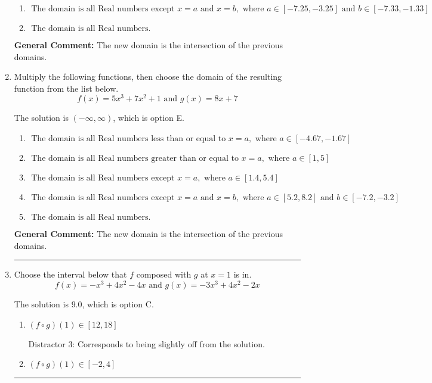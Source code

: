 \documentclass{extbook}[14pt]
\newcommand{\litem}[1]{\item #1

\rule{\textwidth}{0.4pt}}
\begin{document}
\begin{enumerate}
{\begin{enumerate}[label=\Alph*.]
\item \( \text{ The domain is all Real numbers except } x = a \text{ and } x = b, \text{ where } a \in [-7.25, -3.25] \text{ and } b \in [-7.33, -1.33] \)


\item \( \text{ The domain is all Real numbers. } \)


\end{enumerate}

\textbf{General Comment:} The new domain is the intersection of the previous domains.
}
\litem{
Multiply the following functions, then choose the domain of the resulting function from the list below.
\[ f(x) = 5x^{3} +7 x^{2} + 1 \text{ and } g(x) = 8x + 7 \]

The solution is \( (-\infty, \infty) \), which is option E.\begin{enumerate}[label=\Alph*.]
\item \( \text{ The domain is all Real numbers less than or equal to } x = a, \text{ where } a \in [-4.67, -1.67] \)


\item \( \text{ The domain is all Real numbers greater than or equal to } x = a, \text{ where } a \in [1, 5] \)


\item \( \text{ The domain is all Real numbers except } x = a, \text{ where } a \in [1.4, 5.4] \)


\item \( \text{ The domain is all Real numbers except } x = a \text{ and } x = b, \text{ where } a \in [5.2, 8.2] \text{ and } b \in [-7.2, -3.2] \)


\item \( \text{ The domain is all Real numbers. } \)


\end{enumerate}

\textbf{General Comment:} The new domain is the intersection of the previous domains.
}
\litem{
Choose the interval below that $f$ composed with $g$ at $x=1$ is in.
\[ f(x) = -x^{3} +4 x^{2} -4 x \text{ and } g(x) = -3x^{3} +4 x^{2} -2 x \]

The solution is \( 9.0 \), which is option C.\begin{enumerate}[label=\Alph*.]
\item \( (f \circ g)(1) \in [12, 18] \)

 Distractor 3: Corresponds to being slightly off from the solution.
\item \( (f \circ g)(1) \in [-2, 4] \)


\end{enumerate}}
\end{enumerate}
\end{document}
